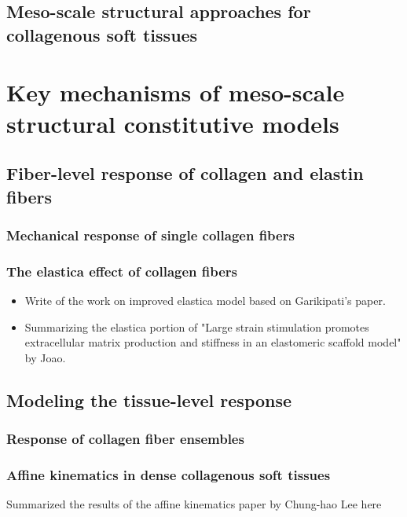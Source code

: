 \subsection{Meso-scale structural approaches for collagenous soft tissues}

\section{Key mechanisms of meso-scale structural constitutive models}
\subsection{Fiber-level response of collagen and elastin fibers}
\subsubsection{Mechanical response of single collagen fibers}
\subsubsection{The elastica effect of collagen fibers}
\begin{itemize}
\item Write of the work on improved elastica model based on Garikipati's paper.
\item Summarizing the elastica portion of "Large strain stimulation promotes extracellular matrix production and stiffness in an elastomeric scaffold model" by Joao. 
\end{itemize}

\subsection{Modeling the tissue-level response}
\subsubsection{Response of collagen fiber ensembles}
\subsubsection{Affine kinematics in dense collagenous soft tissues}
Summarized the results of the affine kinematics paper by Chung-hao Lee here



